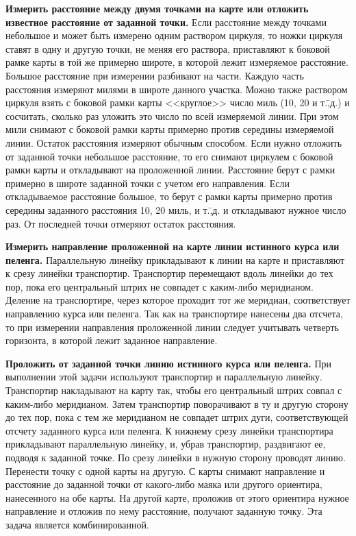 \documentclass[a4paper, 12pt, twoside, final, book, russian, fittopage, cyremdash]{ncc}
\begin{document}
\textbf{Измерить расстояние между двумя точками на карте или отложить известное расстояние от заданной точки.} Если расстояние между точками небольшое и может быть измерено одним раствором циркуля, то ножки циркуля ставят в одну и другую точки, не меняя его раствора, приставляют к боковой рамке карты в той же примерно широте, в которой лежит измеряемое расстояние. Большое расстояние при измерении разбивают на части. Каждую часть расстояния измеряют милями в широте данного участка. Можно также раствором циркуля взять с боковой рамки карты <<круглое>> число миль (10, 20 и т.\=,д.) и сосчитать, сколько раз уложить это число по всей измеряемой линии. При этом мили снимают с боковой рамки карты примерно против середины измеряемой линии. Остаток расстояния измеряют обычным способом. Если нужно отложить от заданной точки небольшое расстояние, то его снимают циркулем с боковой рамки карты и откладывают на проложенной линии. Расстояние берут с рамки примерно в широте заданной точки с учетом его направления. Если откладываемое расстояние большое, то берут с рамки карты примерно против середины заданного расстояния 10, 20 миль, и т.\=,д. и откладывают нужное число раз. От последней точки отмеряют остаток расстояния.
 
\textbf{Измерить направление проложенной на карте линии истинного курса или пеленга.} Параллельную линейку прикладывают к линии на карте и приставляют к срезу линейки транспортир. Транспортир перемещают вдоль линейки до тех пор, пока его центральный штрих не совпадет с каким-либо меридианом. Деление на транспортире, через которое проходит тот же меридиан, соответствует направлению курса или пеленга. Так как на транспортире нанесены два отсчета, то при измерении направления проложенной линии следует учитывать четверть горизонта, в которой лежит заданное направление. 

\textbf{Проложить от заданной точки линию истинного курса или пеленга.} При выполнении этой задачи используют транспортир и параллельную линейку. Транспортир накладывают на карту так, чтобы его центральный штрих совпал с каким-либо меридианом. Затем транспортир поворачивают в ту и другую сторону до тех пор, пока с тем же меридианом не совпадет штрих дуги, соответствующей отсчету заданного курса или пеленга. К нижнему срезу линейки транспортира прикладывают параллельную линейку, и, убрав транспортир, раздвигают ее, подводя к заданной точке. По срезу линейки в нужную сторону проводят линию. Перенести точку с одной карты на другую. С карты снимают направление и расстояние до заданной точки от какого-либо маяка или другого ориентира, нанесенного на обе карты. На другой карте, проложив от этого ориентира нужное направление и отложив по нему расстояние, получают заданную точку. Эта задача является комбинированной.
\end{document}
